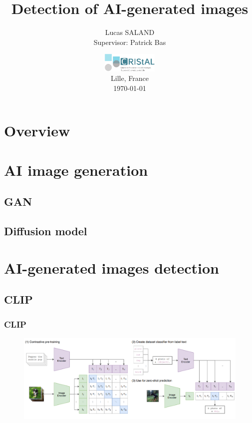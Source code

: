 \documentclass[11pt,compress]{beamer} %
\begin{document}
\title[]{Detection of AI-generated images}
\author{Lucas SALAND\\ Supervisor: Patrick Bas}
\date[\today]{\includegraphics[keepaspectratio,width=0.2\textwidth]{img/cristal.png} \medskip \\ Lille, France \medskip \\ \today}

\frame{\titlepage}

\section*{Overview}
\begin{frame}
  \tableofcontents
\end{frame}

\section{AI image generation}
\subsection{GAN}
\subsection{Diffusion model}

\section{AI-generated images detection}
\subsection{CLIP}
\begin{frame}
    \frametitle{CLIP}
    \begin{figure}
        \includegraphics[width=\textwidth]{img/CLIP.png}
    \end{figure}
\end{frame}
\end{document}

